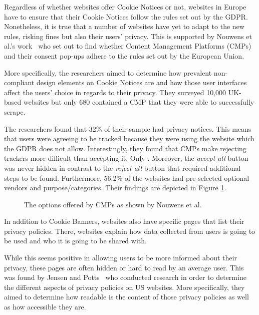 \documentclass[../main.tex]{subfiles}
\begin{document}
Regardless of whether websites offer Cookie Notices or not, websites in Europe have to ensure that their Cookie Notices follow the rules set out by the GDPR. Nonetheless, it is true that a number of websites have yet to adapt to the new rules, risking fines but also their users’ privacy. This is supported by Nouwens et al.'s work~\cite{nouwens2020dark} who set out to find whether Content Management Platforms (CMPs) and their consent pop-ups adhere to the rules set out by the European Union. 

More specifically, the researchers aimed to determine how prevalent non-compliant design elements on Cookie Notices are and how those user interfaces affect the users’ choice in regards to their privacy. They surveyed 10,000 UK-based websites but only 680 contained a CMP that they were able to successfully scrape. 

The researchers found that 32\% of their sample had  privacy notices. This means that users were agreeing to be tracked because they were using the website which the GDPR does not allow. Interestingly, they found that CMPs make rejecting trackers more difficult than accepting it. Only . Moreover, the \textit{accept all} button was never hidden in contrast to the \textit{reject all} button that required additional steps to be found. Furthermore, 56.2\% of the websites had pre-selected optional vendors and purpose/categories. Their findings are depicted in Figure \ref{fig:nouwens}.

\begin{figure}[ht]
    \centering
    \caption{The options offered by CMPs as shown by Nouwens et al.}
    \label{fig:nouwens}
\end{figure}

In addition to Cookie Banners, websites also have specific pages that list their privacy policies. There, websites explain how data collected from users is going to be used and who it is going to be shared with. 

While this seems positive in allowing users to be more informed about their privacy, these pages are often hidden or hard to read by an average user. This was found by Jensen and Potts~\cite{jensen2004privacy} who conducted research in order to determine the different aspects of privacy policies on US websites. More specifically, they aimed to determine how readable is the content of those privacy policies as well as how accessible they are. 
\end{document}
